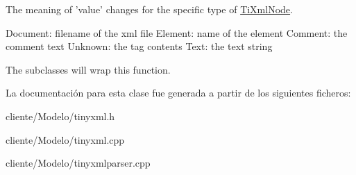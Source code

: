 \-The meaning of 'value' changes for the specific type of \hyperlink{classTiXmlNode}{\-Ti\-Xml\-Node}. \begin{DoxyVerb}
		Document:	filename of the xml file
		Element:	name of the element
		Comment:	the comment text
		Unknown:	the tag contents
		Text:		the text string
		\end{DoxyVerb}


\-The subclasses will wrap this function. 

\-La documentación para esta clase fue generada a partir de los siguientes ficheros\-:\begin{DoxyCompactItemize}
\item 
cliente/\-Modelo/tinyxml.\-h\item 
cliente/\-Modelo/tinyxml.\-cpp\item 
cliente/\-Modelo/tinyxmlparser.\-cpp\end{DoxyCompactItemize}
